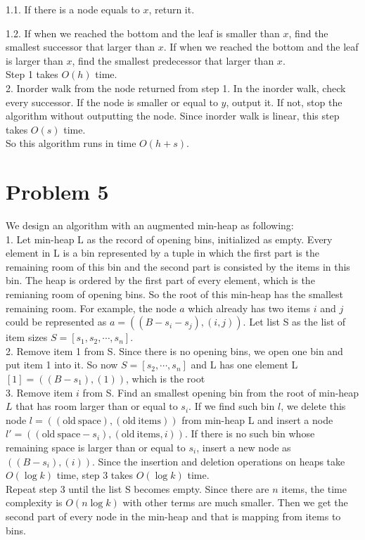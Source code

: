 \documentclass[twoside,11pt]{homework}
\begin{document}
1.1. If there is a node equals to $x$, return it.

1.2. If when we reached the bottom and the leaf is smaller than $x$, find the smallest successor that larger than $x$.
 If when we reached the bottom and the leaf is larger than $x$, find the smallest predecessor that larger than $x$.
\\
Step 1 takes $O(h)$ time.
\\
2. Inorder walk from the node returned from step 1.
In the inorder walk, check every successor.
If the node is smaller or equal to $y$, output it.
If not, stop the algorithm without outputting the node.
Since inorder walk is linear, this step takes $O(s)$ time. \\
So this algorithm runs in time $O(h+s)$.

\section*{Problem 5}
We design an algorithm with an augmented min-heap as following:\\
1. Let min-heap L as the record of opening bins, initialized as empty. 
Every element in L is a bin represented by a tuple in which the first part is the remaining room of this bin and the second part is consisted by the items in this bin.
The heap is ordered by the first part of every element, which is the remianing room of opening bins.
So the root of this min-heap has the smallest remaining room.
For example, the node $a$ which already has two items $i$ and $j$ could be represented as $a = ((B-s_i-s_j), (i, j))$.
Let list S as the list of item sizes $S = [s_1, s_2, \cdots, s_n]$.\\
2. Remove item 1 from S.
Since there is no opening bins, we open one bin and put item 1 into it.
So now $S = [s_2, \cdots, s_n]$ and L has one element L$[1] = ((B-s_1), (1))$, which is the root\\
3. Remove item $i$ from S.
Find an smallest opening bin from the root of min-heap $L$ that has room larger than or equal to $s_i$.
If we find such bin  $l$, we delete this node $l = ((\mathrm{old\ space}),  (\mathrm{old\ items}))$ from min-heap L and insert a node $l' =  ((\mathrm{old\ space} - s_i), (\mathrm{old\ items}, i))$.
If there is no such bin whose remaining space is larger than or equal to $s_i$, insert a new node as $((B-s_i), (i))$. 
Since the insertion and deletion operations on heaps take $O(\log k)$ time, step 3 takes $O(\log k)$ time.\\
Repeat step 3 until the list S becomes empty.
Since there are $n$ items, the time complexity is $O(n \log k)$ with other terms are much smaller.
Then we get the second part of every node in the min-heap and that is mapping from items to bins.
\end{document}
